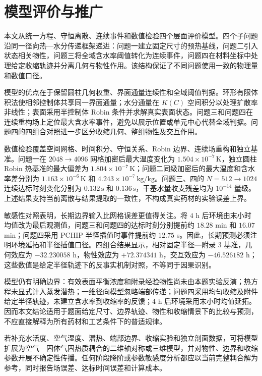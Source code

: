\section{模型评价与推广}

本文从统一方程、守恒离散、连续事件和数值检验四个层面评价模型。四个子问题沿同一径向热—水分传递框架递进：问题一建立固定尺寸的预热基线，问题二引入状态相关物性，问题三将全域含水率阈值转化为连续事件，问题四在材料坐标中处理给定收缩轨迹并分离几何与物性作用。该结构保证了不同问题使用一致的物理量和数值口径。

模型的优点在于保留圆柱几何权重、界面通量连续性和全域阈值判据。环形有限体积法使相邻控制体共享同一界面通量；水分通量在 $K(C)$ 空间积分以处理扩散率非线性；表面采用半控制体 Robin 条件并求解真实表面状态。问题三和问题四在连续重构场上定位最大含水率事件，避免以展示位置或单元中心代替全域判据。问题四的四组合对照进一步区分收缩几何、整组物性及交互作用。

数值检验覆盖空间网格、时间积分、守恒关系、Robin 边界、连续场重构和独立基准。问题一在 $2048\to4096$ 网格加密后最大温度变化为 $1.504\times10^{-7}\,\mathrm K$，独立圆柱 Robin 热基准的最大偏差为 $1.804\times10^{-7}\,\mathrm K$；问题二同级加密后的最大温度和含水率差分别为 $1.163\times10^{-6}\,\mathrm K$ 和 $4.243\times10^{-7}\,\mathrm{kg/kg}$。问题三、四的 $N=512\to1024$ 连续达标时刻变化分别为 $0.132\,\mathrm s$ 和 $0.136\,\mathrm s$，干基水量收支残差均为 $10^{-14}$ 量级。上述结果支持当前离散与结果提取的一致性，不构成真实药材的实验误差上界。

敏感性对照表明，长期边界输入比网格误差更值得关注。将 $4$ h 后环境由末小时均值改为最后观测值，问题三和问题四的达标时刻分别提前约 $18.28$ min 和 $16.07$ min；问题四采用 PCHIP 半径插值时事件提前约 $12.75$ s。因此，长期预测必须注明环境延拓和半径插值口径。四组合结果显示，相对固定半径—附录 3 基准，几何效应为 $-32.230058$ h，物性效应为 $+72.374341$ h，交互效应为 $-46.526182$ h；这些数值是给定半径轨迹下的反事实机制对照，不等同于因果识别。

模型仍有明确边界：有效表面平衡浓度和附录经验物性尚未由本题实验反演；热方程未显式计入蒸发潜热；一维径向模型忽略端部传递；问题四采用均匀收缩及附件给定半径轨迹，未建立含水率到收缩率的反馈；$4$ h 后环境采用末小时均值延拓。因而本文结论适用于题面给定尺寸、边界轨迹、物性和收缩情景下的比较与预测，不应直接解释为所有药材和工艺条件下的普适规律。

若补充水活度、空气湿度、潜热、端部边界、收缩实验和独立剖面数据，可将模型扩展为空气—固体气固热质耦合的二维轴对称或三维模型，并对物性、边界和收缩参数开展不确定性传播。任何阶段降阶或参数敏感度分析都应以当前完整耦合解为参考，同时报告场误差、达标时间误差和计算成本。
